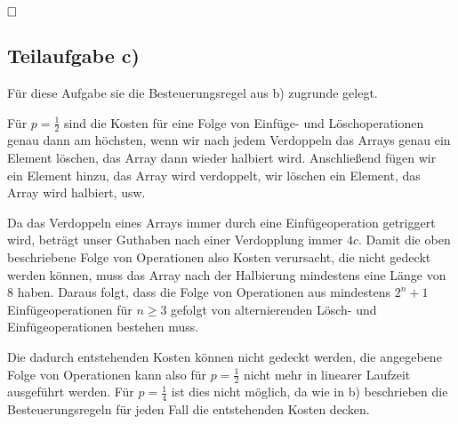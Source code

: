 \documentclass[12pt]{scrartcl}%
\theoremstyle{nonumberplain}
\begin{document}
$\hfill \square$

\subsection*{Teilaufgabe c)}

Für diese Aufgabe sie die Besteuerungsregel aus b) zugrunde gelegt.

Für $p = \frac{1}{2}$ sind die Kosten für eine Folge von Einfüge- und Löschoperationen genau dann am höchsten, wenn wir nach jedem Verdoppeln das Arrays genau ein Element löschen, das Array dann wieder halbiert wird. Anschließend fügen wir ein Element hinzu, das Array wird verdoppelt, wir löschen ein Element, das Array wird halbiert, usw.

Da das Verdoppeln eines Arrays immer durch eine Einfügeoperation getriggert wird, beträgt unser Guthaben nach einer Verdopplung immer $4c$. Damit die oben beschriebene Folge von Operationen also Kosten verursacht, die nicht gedeckt werden können, muss das Array nach der Halbierung mindestens eine Länge von 8 haben. Daraus folgt, dass die Folge von Operationen aus mindestens $2^n + 1$ Einfügeoperationen für $n \ge 3$ gefolgt von alternierenden Lösch- und Einfügeoperationen bestehen muss.

Die dadurch entstehenden Kosten können nicht gedeckt werden, die angegebene Folge von Operationen kann also für $p = \frac{1}{2}$ nicht mehr in linearer Laufzeit ausgeführt werden. Für $p = \frac{1}{4}$ ist dies nicht möglich, da wie in b) beschrieben die Besteuerungsregeln für jeden Fall die entstehenden Kosten decken.
\end{document}
